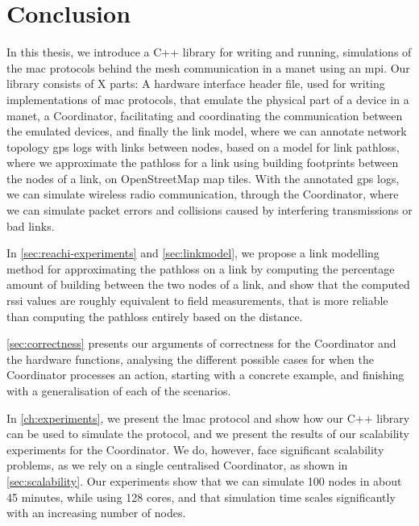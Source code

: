 \chapter{Conclusion}\label{ch:conclusion}
In this thesis, we introduce a C++ library for writing and running, simulations of the \gls{mac} protocols
behind the mesh communication in a \gls{manet} using an \gls{mpi}. Our library consists of X parts: A hardware
interface header file, used for writing implementations of \gls{mac} protocols, that emulate the physical part
of a device in a \gls{manet}, a Coordinator, facilitating and coordinating the communication between the
emulated devices, and finally the link model, where we can annotate network topology \gls{gps} logs with links
between nodes, based on a model for link \gls{pathloss}, where we approximate the \gls{pathloss} for a link
using building footprints between the nodes of a link, on OpenStreetMap map tiles. With the annotated
\gls{gps} logs, we can simulate wireless radio communication, through the Coordinator, where we can
simulate packet errors and collisions caused by interfering transmissions or bad links. \smallbreak

In \autoref{sec:reachi-experiments} and \autoref{sec:linkmodel}, we propose a link modelling method for
approximating the \gls{pathloss} on a link by computing the percentage amount of building between the two
nodes of a link, and show that the computed \gls{rssi} values are roughly equivalent to field measurements,
that is more reliable than computing the \gls{pathloss} entirely based on the distance. \smallbreak

\autoref{sec:correctness} presents our arguments of correctness for the Coordinator and the hardware
functions, analysing the different possible cases for when the Coordinator processes an action, starting with 
a concrete example, and finishing with a generalisation of each of the scenarios. \smallbreak

In \autoref{ch:experiments}, we present the \gls{lmac} protocol and show how our C++ library can be used to
simulate the protocol, and we present the results of our scalability experiments for the Coordinator. We do,
however, face significant scalability problems, as we rely on a single centralised Coordinator, as shown in
\autoref{sec:scalability}. Our experiments show that we can simulate 100 nodes in about 45 minutes, while
using 128 cores, and that simulation time scales significantly with an increasing number of nodes.

